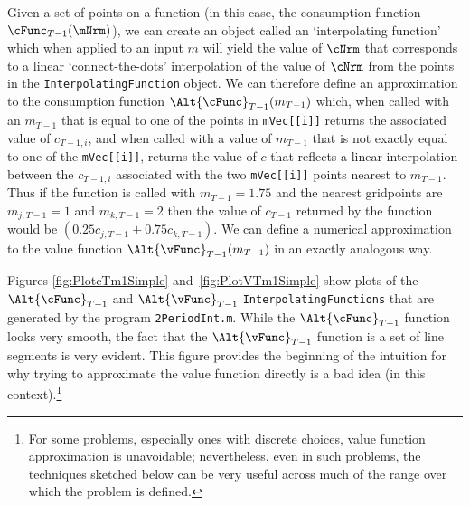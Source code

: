 \documentclass[titlepage, headings=optiontotocandhead]{\econtex}
\begin{document}
Given a set of points on a function (in this case, the consumption function $\cFunc_{T-1}(\mNrm)$), we can create an object called an `interpolating function' which when applied to an input ${m}$ will yield the value of $\cNrm$ that corresponds to a linear `connect-the-dots' interpolation of the value of $\cNrm$ from the points in the \texttt{InterpolatingFunction} object.  We can therefore define an approximation to the consumption function $\Alt{\cFunc}_{T-1}({m}_{T-1})$ which, when called with an ${m}_{T-1}$ that is equal to one of the points in \texttt{mVec[[i]]} returns the associated value of ${c}_{T-1,i}$, and when called with a value of ${m}_{T-1}$ that is not exactly equal to one of the \texttt{mVec[[i]]}, returns the value of ${c}$ that reflects a linear interpolation between the ${c}_{T-1,i}$ associated with the two \texttt{mVec[[i]]} points nearest to ${m}_{T-1}$.  Thus if the function is called with ${m}_{T-1} = 1.75$ and the nearest gridpoints  are ${m}_{j,T-1}=1$ and ${m}_{k,T-1}=2$ then the value of ${c}_{T-1}$ returned by the function would be $(0.25 {c}_{j,T-1}+0.75 {c}_{k,T-1})$. We can define a numerical approximation to the value function $\Alt{\vFunc}_{T-1}({m}_{T-1})$ in an exactly analogous way.


Figures \ref{fig:PlotcTm1Simple} and~\ref{fig:PlotVTm1Simple} show
plots of the $\Alt{\cFunc}_{T-1}$ and $\Alt{\vFunc}_{T-1}$
\texttt{InterpolatingFunctions} that are generated by the program
\texttt{2PeriodInt.m}.  While the $\Alt{\cFunc}_{T-1}$ function looks
very smooth, the fact that the $\Alt{\vFunc}_{T-1}$ function is a set
of line segments is very evident.  This figure provides the beginning
of the intuition for why trying to approximate the value function
directly is a bad idea (in this context).\footnote{For some problems,
  especially ones with discrete choices, value function approximation is unavoidable;
  nevertheless, even in such problems, the techniques sketched below can
  be very useful across much of the range over which the problem is defined.}
\end{document}
